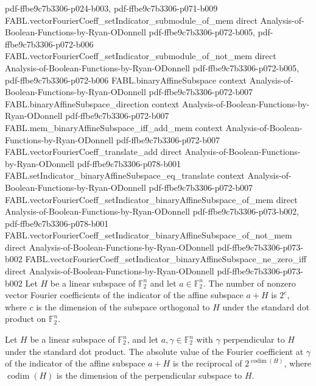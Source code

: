\begin{theorem}
  {pdf-ffbe9c7b3306-p024-b003,
    pdf-ffbe9c7b3306-p071-b009}
\proofstep
  {FABL.vectorFourierCoeff_setIndicator_submodule_of_mem}
  {direct}
  {Analysis-of-Boolean-Functions-by-Ryan-ODonnell}
  {pdf-ffbe9c7b3306-p072-b005,
    pdf-ffbe9c7b3306-p072-b006}
\proofstep
  {FABL.vectorFourierCoeff_setIndicator_submodule_of_not_mem}
  {direct}
  {Analysis-of-Boolean-Functions-by-Ryan-ODonnell}
  {pdf-ffbe9c7b3306-p072-b005,
    pdf-ffbe9c7b3306-p072-b006}
\proofstep
  {FABL.binaryAffineSubspace}
  {context}
  {Analysis-of-Boolean-Functions-by-Ryan-ODonnell}
  {pdf-ffbe9c7b3306-p072-b007}
\proofstep
  {FABL.binaryAffineSubspace_direction}
  {context}
  {Analysis-of-Boolean-Functions-by-Ryan-ODonnell}
  {pdf-ffbe9c7b3306-p072-b007}
\proofstep
  {FABL.mem_binaryAffineSubspace_iff_add_mem}
  {context}
  {Analysis-of-Boolean-Functions-by-Ryan-ODonnell}
  {pdf-ffbe9c7b3306-p072-b007}
\proofstep
  {FABL.vectorFourierCoeff_translate_add}
  {direct}
  {Analysis-of-Boolean-Functions-by-Ryan-ODonnell}
  {pdf-ffbe9c7b3306-p078-b001}
\proofstep
  {FABL.setIndicator_binaryAffineSubspace_eq_translate}
  {context}
  {Analysis-of-Boolean-Functions-by-Ryan-ODonnell}
  {pdf-ffbe9c7b3306-p072-b007}
\proofstep
  {FABL.vectorFourierCoeff_setIndicator_binaryAffineSubspace_of_mem}
  {direct}
  {Analysis-of-Boolean-Functions-by-Ryan-ODonnell}
  {pdf-ffbe9c7b3306-p073-b002,
    pdf-ffbe9c7b3306-p078-b001}
\proofstep
  {FABL.vectorFourierCoeff_setIndicator_binaryAffineSubspace_of_not_mem}
  {direct}
  {Analysis-of-Boolean-Functions-by-Ryan-ODonnell}
  {pdf-ffbe9c7b3306-p073-b002}
\proofstep
  {FABL.vectorFourierCoeff_setIndicator_binaryAffineSubspace_ne_zero_iff}
  {direct}
  {Analysis-of-Boolean-Functions-by-Ryan-ODonnell}
  {pdf-ffbe9c7b3306-p073-b002}
Let $H$ be a linear subspace of $\mathbb F_2^n$ and let $a\in\mathbb F_2^n$. The number
of nonzero vector Fourier coefficients of the indicator of the affine subspace $a+H$ is
$2^c$, where $c$ is the dimension of the subspace orthogonal to $H$ under the standard
dot product on $\mathbb F_2^n$.
\end{theorem}

\begin{theorem}
\label{FABL.abs_vectorFourierCoeff_setIndicator_binaryAffineSubspace_of_mem}
\leanok
{}
Let $H$ be a linear subspace of $\mathbb F_2^n$, and let $a,\gamma\in\mathbb F_2^n$ with
$\gamma$ perpendicular to $H$ under the standard dot product. The absolute value of the
Fourier coefficient at $\gamma$ of the indicator of the affine subspace $a+H$ is the
reciprocal of $2^{\operatorname{codim}(H)}$, where $\operatorname{codim}(H)$ is the
dimension of the perpendicular subspace to $H$.
\end{theorem}


